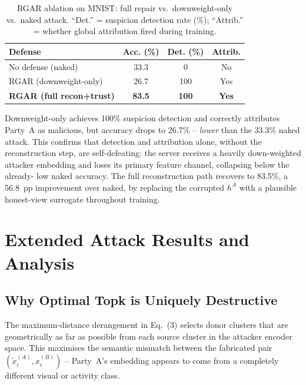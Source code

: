 \documentclass{article}
\begin{document}
\begin{table}[h]
\centering
\caption{RGAR ablation on MNIST: full repair vs.\ downweight-only vs.\ naked
  attack. ``Det.'' = suspicion detection rate (\%); ``Attrib.'' = whether
  global attribution fired during training.}
\label{tab:rgar_ablation}
\small
\begin{tabular}{l c c c}
\toprule
\textbf{Defense}                 & \textbf{Acc. (\%)} & \textbf{Det. (\%)} & \textbf{Attrib.} \\
\midrule
No defense (naked)               & 33.3  & 0   & No  \\
RGAR (downweight-only)           & 26.7  & 100 & Yes \\
\textbf{RGAR (full recon+trust)} & \textbf{83.5}  & \textbf{100} & \textbf{Yes} \\
\bottomrule
\end{tabular}
\end{table}

Downweight-only achieves 100\% suspicion detection and correctly attributes
Party~A as malicious, but accuracy drops to 26.7\% -- \emph{lower} than the
33.3\% naked attack.
This confirms that detection and attribution alone, without the reconstruction
step, are self-defeating: the server receives a heavily down-weighted attacker
embedding and loses its primary feature channel, collapsing below the already-
low naked accuracy.
The full reconstruction path recovers to 83.5\%, a 56.8~pp improvement over
naked, by replacing the corrupted $h^A$ with a plausible honest-view
surrogate throughout training.

\section{Extended Attack Results and Analysis}
\label{app:extended_attack}

\subsection{Why Optimal Topk is Uniquely Destructive}

The maximum-distance derangement in Eq.~(3) selects donor clusters that are
geometrically as far as possible from each source cluster in the attacker
encoder space.
This maximises the semantic mismatch between the fabricated pair
$(\tilde{x}^{(A)}_i, x^{(B)}_i)$ -- Party~A's embedding appears to come from
a completely different visual or activity class.
\end{document}
